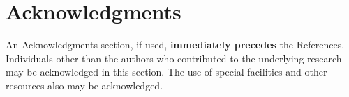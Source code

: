 \documentclass[journal]{new-aiaa}
\begin{document}
\section*{Acknowledgments}
An Acknowledgments section, if used, \textbf{immediately precedes} the References. Individuals other than the authors who contributed to the underlying research may be acknowledged in this section. The use of special facilities and other resources also may be acknowledged. 


\end{document}
